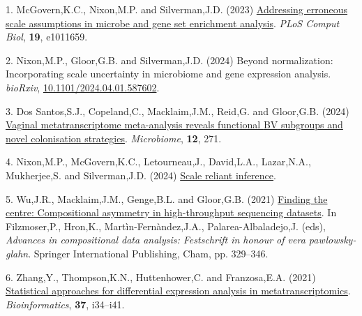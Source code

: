 \documentclass[
]{article}
\newlength{\cslhangindent}
\newenvironment{CSLReferences}[2] %
 {\begin{list}{}{%
  \setlength{\itemindent}{0pt}
  \setlength{\leftmargin}{0pt}
  \setlength{\parsep}{0pt}
  \ifodd #1
   \setlength{\leftmargin}{\cslhangindent}
   \setlength{\itemindent}{-1\cslhangindent}
  \fi
  \setlength{\itemsep}{#2\baselineskip}}}
 {\end{list}}
\begin{document}
\label{refs}
\begin{CSLReferences}{1}{1}
1. McGovern,K.C., Nixon,M.P. and Silverman,J.D. (2023)
\href{https://doi.org/10.1371/journal.pcbi.1011659}{Addressing erroneous
scale assumptions in microbe and gene set enrichment analysis}.
\emph{PLoS Comput Biol}, \textbf{19}, e1011659.

2. Nixon,M.P., Gloor,G.B. and Silverman,J.D. (2024) Beyond
normalization: Incorporating scale uncertainty in microbiome and gene
expression analysis. \emph{bioRxiv},
\href{https://doi.org/10.1101/2024.04.01.587602}{10.1101/2024.04.01.587602}.

3. Dos Santos,S.J., Copeland,C., Macklaim,J.M., Reid,G. and Gloor,G.B.
(2024) \href{https://doi.org/10.1186/s40168-024-01992-w}{Vaginal
metatranscriptome meta-analysis reveals functional {BV} subgroups and
novel colonisation strategies}. \emph{Microbiome}, \textbf{12}, 271.

4. Nixon,M.P., McGovern,K.C., Letourneau,J., David,L.A., Lazar,N.A.,
Mukherjee,S. and Silverman,J.D. (2024)
\href{https://arxiv.org/abs/2201.03616}{Scale reliant inference}.

5. Wu,J.R., Macklaim,J.M., Genge,B.L. and Gloor,G.B. (2021)
\href{https://doi.org/10.1007/978-3-030-71175-7_17}{Finding the centre:
Compositional asymmetry in high-throughput sequencing datasets}. In
Filzmoser,P., Hron,K., Martìn-Fernàndez,J.A., Palarea-Albaladejo,J.
(eds), \emph{Advances in compositional data analysis: Festschrift in
honour of vera pawlowsky-glahn}. Springer International Publishing,
Cham, pp. 329--346.

6. Zhang,Y., Thompson,K.N., Huttenhower,C. and Franzosa,E.A. (2021)
\href{https://doi.org/10.1093/bioinformatics/btab327}{Statistical
approaches for differential expression analysis in metatranscriptomics}.
\emph{Bioinformatics}, \textbf{37}, i34--i41.

\end{CSLReferences}
\end{document}
